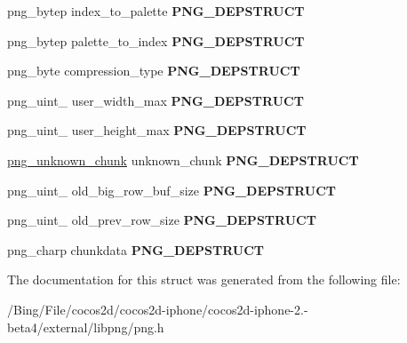 \begin{DoxyCompactItemize}
\item 
\hypertarget{structpng__struct__def_afc12eee42cc64c8b6b83b3ea5454b312}{png\-\_\-bytep index\-\_\-to\-\_\-palette {\bfseries P\-N\-G\-\_\-\-D\-E\-P\-S\-T\-R\-U\-C\-T}}\label{structpng__struct__def_afc12eee42cc64c8b6b83b3ea5454b312}

\item 
\hypertarget{structpng__struct__def_a034c157ce22db4f88f65ea32556027d8}{png\-\_\-bytep palette\-\_\-to\-\_\-index {\bfseries P\-N\-G\-\_\-\-D\-E\-P\-S\-T\-R\-U\-C\-T}}\label{structpng__struct__def_a034c157ce22db4f88f65ea32556027d8}

\item 
\hypertarget{structpng__struct__def_afec49b002c2f40308d3cb21ee0a26811}{png\-\_\-byte compression\-\_\-type {\bfseries P\-N\-G\-\_\-\-D\-E\-P\-S\-T\-R\-U\-C\-T}}\label{structpng__struct__def_afec49b002c2f40308d3cb21ee0a26811}

\item 
\hypertarget{structpng__struct__def_af95d866277206268927bea2ef8d9be33}{png\-\_\-uint\-\_ user\-\_\-width\-\_\-max {\bfseries P\-N\-G\-\_\-\-D\-E\-P\-S\-T\-R\-U\-C\-T}}\label{structpng__struct__def_af95d866277206268927bea2ef8d9be33}

\item 
\hypertarget{structpng__struct__def_a879c4f7079bca34931af0974c244fb86}{png\-\_\-uint\-\_ user\-\_\-height\-\_\-max {\bfseries P\-N\-G\-\_\-\-D\-E\-P\-S\-T\-R\-U\-C\-T}}\label{structpng__struct__def_a879c4f7079bca34931af0974c244fb86}

\item 
\hypertarget{structpng__struct__def_ae57e3983c742c075b1c80163bf6cf91c}{\hyperlink{structpng__unknown__chunk__t}{png\-\_\-unknown\-\_\-chunk} unknown\-\_\-chunk {\bfseries P\-N\-G\-\_\-\-D\-E\-P\-S\-T\-R\-U\-C\-T}}\label{structpng__struct__def_ae57e3983c742c075b1c80163bf6cf91c}

\item 
\hypertarget{structpng__struct__def_ae92d8098eb134f3f5d46dc6bdb180862}{png\-\_\-uint\-\_ old\-\_\-big\-\_\-row\-\_\-buf\-\_\-size {\bfseries P\-N\-G\-\_\-\-D\-E\-P\-S\-T\-R\-U\-C\-T}}\label{structpng__struct__def_ae92d8098eb134f3f5d46dc6bdb180862}

\item 
\hypertarget{structpng__struct__def_ae8d4cdbc11ea19db0ae3d0b9851d3e2c}{png\-\_\-uint\-\_ old\-\_\-prev\-\_\-row\-\_\-size {\bfseries P\-N\-G\-\_\-\-D\-E\-P\-S\-T\-R\-U\-C\-T}}\label{structpng__struct__def_ae8d4cdbc11ea19db0ae3d0b9851d3e2c}

\item 
\hypertarget{structpng__struct__def_a518824a9c86b21dab24d688af04ea3d7}{png\-\_\-charp chunkdata {\bfseries P\-N\-G\-\_\-\-D\-E\-P\-S\-T\-R\-U\-C\-T}}\label{structpng__struct__def_a518824a9c86b21dab24d688af04ea3d7}

\end{DoxyCompactItemize}


The documentation for this struct was generated from the following file\-:\begin{DoxyCompactItemize}
\item 
/\-Bing/\-File/cocos2d/cocos2d-\/iphone/cocos2d-\/iphone-\/2.-\/beta4/external/libpng/png.\-h\end{DoxyCompactItemize}
